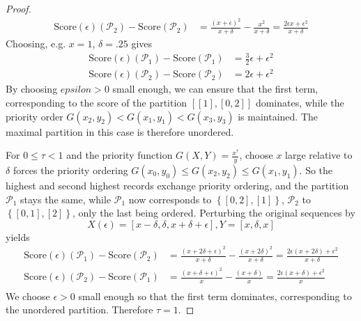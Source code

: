 \documentclass{article}
\theoremstyle{case}
\begin{document}
\begin{proof}
\begin{align*}
\text{Score}\left(\epsilon \right)\left(\mathcal{P}_2 \right) - \text{Score}\left(\mathcal{P}_2 \right) &= \frac{\left( x + \epsilon\right)^2}{x + \delta}  - \frac{x^2}{x+\delta}= \frac{2\epsilon x + \epsilon^2}{x+\delta}
\end{align*}
Choosing, e.g. $x = 1$, $\delta = .25$ gives 
\begin{align*}
\text{Score}\left(\epsilon \right)\left(\mathcal{P}_1 \right) - \text{Score}\left(\mathcal{P}_1 \right) &= \frac{3}{2}\epsilon + \epsilon^2 \\
\text{Score}\left(\epsilon \right)\left(\mathcal{P}_2 \right) - \text{Score}\left(\mathcal{P}_2 \right) &= 2\epsilon + \epsilon^2
\end{align*}
By choosing $epsilon > 0$ small enough, we can ensure that the first term, corresponding to the score of the partition $\left[ \left[ 1\right], \left[ 0, 2\right]\right]$ dominates, while the priority order $G(x_2, y_2) < G(x_1, y_1) < G(x_3, y_3)$ is maintained. The maximal partition in this case is therefore unordered.


For $ 0 \leq \tau < 1$ and the priority function $G(X,Y) = \frac{x^{\tau}}{y}$, choose $x$ large relative to $\delta$ forces the priority ordering $G(x_0, y_0) \leq G(x_2, y_2) \leq G(x_1, y_1)$. So the  highest and second highest records exchange priority ordering, and the partition $\mathcal{P}_1$ stays the same, while $\mathcal{P}_1$ now corresponds to $\left\lbrace \left[ 0, 2\right], \left[ 1\right]\right\rbrace$, $\mathcal{P}_2$ to $\left\lbrace \left[ 0, 1\right], \left[ 2\right]\right\rbrace$, only the last being ordered. Perturbing the original sequences by
\[
X\left(\epsilon\right) = \left[ x-\delta, \delta, x + \delta + \epsilon\right], Y = \left[ x, \delta, x\right]
\]
yields
\begin{align*}
\text{Score}\left(\epsilon \right)\left(\mathcal{P}_1 \right) - \text{Score}\left(\mathcal{P}_2 \right) &= \frac{\left( x + 2\delta + \epsilon\right)^2}{x + \delta}  - \frac{\left( x + 2\delta\right)^2}{x + \delta} = \frac{2\epsilon\left( x + 2\delta\right) + \epsilon^2}{x + \delta} \\
\text{Score}\left(\epsilon \right)\left(\mathcal{P}_2 \right) - \text{Score}\left(\mathcal{P}_1 \right) &= \frac{\left( x + \delta + \epsilon\right)^2}{x} - \frac{\left( x + \delta\right)}{x} = \frac{2\epsilon\left( x + \delta \right) + \epsilon^2}{x} \\
\end{align*}
We choose $\epsilon > 0$ small enough so that the first term dominates, corresponding to the unordered partition. Therefore $\tau = 1$.

\end{proof} 
\end{document}
